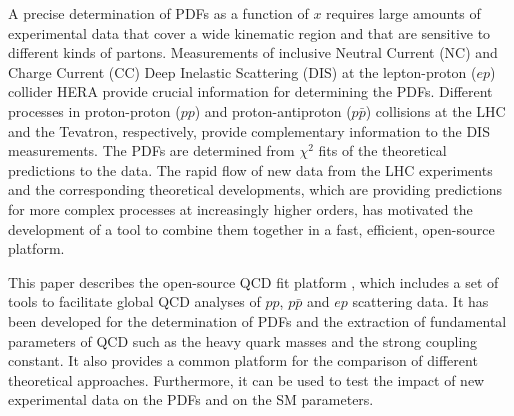 A precise determination of PDFs as a function of $x$ requires large amounts of
experimental data that cover a wide kinematic region and that are sensitive to different kinds of partons. Measurements of inclusive Neutral Current (NC) and Charge Current (CC) Deep Inelastic Scattering (DIS) at the lepton-proton ($ep$) collider HERA provide crucial information for determining the PDFs. Different processes in  proton-proton ($pp$) and proton-antiproton ($p \bar p$) collisions at the LHC and the Tevatron, respectively, 
provide complementary information to the DIS measurements.
 The PDFs are determined
from $\chi^2$ fits of the theoretical predictions to the 
data. 
The rapid flow of new data from the LHC experiments and the corresponding theoretical developments, which are providing predictions for more complex processes at increasingly higher orders, has motivated the development of a tool to combine them  together in a fast, efficient, open-source platform.
%

This paper describes the open-source QCD fit platform \fitter, which includes a set of tools to facilitate global 
QCD analyses of $pp$, $p\bar{p}$ and $ep$ scattering data. 
It has been developed for the determination of PDFs and the extraction of fundamental parameters of QCD such as the heavy
quark masses and the strong coupling constant. It also provides a common platform for the
comparison of different theoretical approaches. Furthermore, it can be used to test the impact 
of new experimental data on the PDFs and on the SM parameters.

